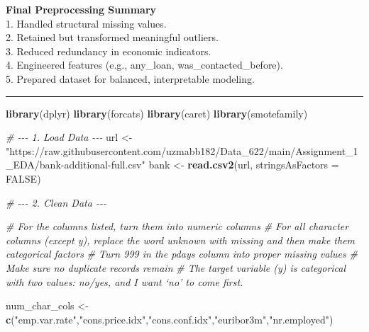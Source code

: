 \documentclass[
]{article}
\newenvironment{Shaded}{\begin{snugshade}}{\end{snugshade}}
\newcommand{\AttributeTok}[1]{\textcolor[rgb]{0.13,0.29,0.53}{#1}}
\newcommand{\CommentTok}[1]{\textcolor[rgb]{0.56,0.35,0.01}{\textit{#1}}}
\newcommand{\ConstantTok}[1]{\textcolor[rgb]{0.56,0.35,0.01}{#1}}
\newcommand{\FunctionTok}[1]{\textcolor[rgb]{0.13,0.29,0.53}{\textbf{#1}}}
\newcommand{\NormalTok}[1]{#1}
\newcommand{\OtherTok}[1]{\textcolor[rgb]{0.56,0.35,0.01}{#1}}
\newcommand{\StringTok}[1]{\textcolor[rgb]{0.31,0.60,0.02}{#1}}
\begin{document}
\textbf{Final Preprocessing Summary}\\
1. Handled structural missing values.\\
2. Retained but transformed meaningful outliers.\\
3. Reduced redundancy in economic indicators.\\
4. Engineered features (e.g., any\_loan, was\_contacted\_before).\\
5. Prepared dataset for balanced, interpretable modeling.

\begin{center}\rule{0.5\linewidth}{0.5pt}\end{center}

\begin{Shaded}
\begin{Highlighting}[]
\FunctionTok{library}\NormalTok{(dplyr)}
\FunctionTok{library}\NormalTok{(forcats)}
\FunctionTok{library}\NormalTok{(caret)}
\FunctionTok{library}\NormalTok{(smotefamily)}

\CommentTok{\# {-}{-}{-} 1. Load Data {-}{-}{-}}
\NormalTok{url }\OtherTok{\textless{}{-}} \StringTok{"https://raw.githubusercontent.com/uzmabb182/Data\_622/main/Assignment\_1\_EDA/bank{-}additional{-}full.csv"}
\NormalTok{bank }\OtherTok{\textless{}{-}} \FunctionTok{read.csv2}\NormalTok{(url, }\AttributeTok{stringsAsFactors =} \ConstantTok{FALSE}\NormalTok{)}

\CommentTok{\# {-}{-}{-} 2. Clean Data {-}{-}{-}}

\CommentTok{\# For the columns listed, turn them into numeric columns}
\CommentTok{\# For all character columns (except y), replace the word \textquotesingle{}unknown\textquotesingle{} with \textquotesingle{}missing\textquotesingle{} and then make them categorical factors}
\CommentTok{\# Turn 999 in the pdays column into proper missing values}
\CommentTok{\# Make sure no duplicate records remain}
\CommentTok{\# The target variable (y) is categorical with two values: no/yes, and I want ‘no’ to come first.}

\NormalTok{num\_char\_cols }\OtherTok{\textless{}{-}} \FunctionTok{c}\NormalTok{(}\StringTok{"emp.var.rate"}\NormalTok{,}\StringTok{"cons.price.idx"}\NormalTok{,}\StringTok{"cons.conf.idx"}\NormalTok{,}\StringTok{"euribor3m"}\NormalTok{,}\StringTok{"nr.employed"}\NormalTok{)}


\end{Highlighting}
\end{Shaded}
\end{document}
